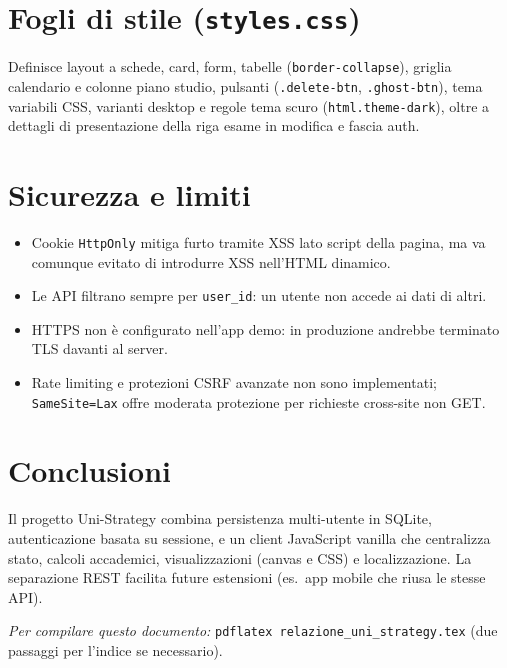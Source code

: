\documentclass[11pt,a4paper]{article}
\begin{document}
\section{Fogli di stile (\texttt{styles.css})}
Definisce layout a schede, card, form, tabelle (\texttt{border-collapse}), griglia calendario e colonne piano studio, pulsanti (\texttt{.delete-btn}, \texttt{.ghost-btn}), tema variabili CSS, varianti desktop e regole tema scuro (\texttt{html.theme-dark}), oltre a dettagli di presentazione della riga esame in modifica e fascia auth.

\section{Sicurezza e limiti}
\begin{itemize}[leftmargin=*]
  \item Cookie \texttt{HttpOnly} mitiga furto tramite XSS lato script della pagina, ma va comunque evitato di introdurre XSS nell'HTML dinamico.
  \item Le API filtrano sempre per \texttt{user\_id}: un utente non accede ai dati di altri.
  \item HTTPS non è configurato nell'app demo: in produzione andrebbe terminato TLS davanti al server.
  \item Rate limiting e protezioni CSRF avanzate non sono implementati; \texttt{SameSite=Lax} offre moderata protezione per richieste cross-site non GET.
\end{itemize}

\section{Conclusioni}
Il progetto Uni-Strategy combina persistenza multi-utente in SQLite, autenticazione basata su sessione, e un client JavaScript vanilla che centralizza stato, calcoli accademici, visualizzazioni (canvas e CSS) e localizzazione. La separazione REST facilita future estensioni (es.\ app mobile che riusa le stesse API).

\vspace{1em}
\noindent\textit{Per compilare questo documento:} \texttt{pdflatex relazione\_uni\_strategy.tex} (due passaggi per l'indice se necessario).
\end{document}
